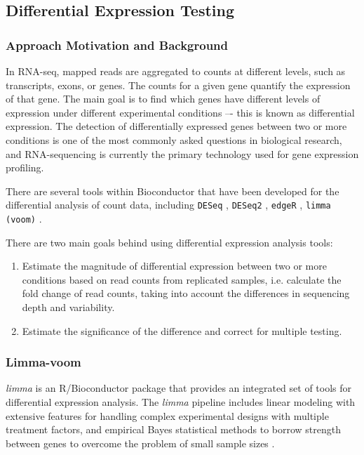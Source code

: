     \subsection{Differential Expression Testing}
    \subsubsection{Approach Motivation and Background}
    In RNA-seq, mapped reads are aggregated to counts at different levels, such as transcripts, exons, or genes. The counts for a given gene quantify the expression of that gene. The main goal is to find which genes have different levels of expression under different experimental conditions –- this is known as differential expression.
    The detection of differentially expressed genes between two or more conditions is one of the most commonly asked questions in biological research, and RNA-sequencing is currently the primary technology used for gene expression profiling.

    There are several tools within Bioconductor that have been developed for the differential analysis of count data, including \texttt{DESeq} \cite{anders2010differential}, \texttt{DESeq2} \cite{love2014moderated}, \texttt{edgeR} \cite{Robinson2010EdgeR:Data}, \texttt{limma (voom)} \cite{Ritchie2015LimmaStudies}.

    There are two main goals behind using differential expression analysis tools:
    \begin{enumerate}
    \item Estimate the magnitude of differential expression between two or more conditions based on read counts from replicated samples, i.e. calculate the fold change of read counts, taking into account the differences in sequencing depth and variability.
    \item Estimate the significance of the difference and correct for multiple testing.
    \end{enumerate}

        
        \subsubsection{Limma-voom} \label{section:voom}
        \textit{limma} is an R/Bioconductor package \cite{Ritchie2015LimmaStudies, smyth2004linear}  that provides an integrated set of tools for differential expression analysis. The \textit{limma} pipeline includes linear modeling with extensive features for handling complex experimental designs with multiple treatment factors, and empirical Bayes statistical methods to borrow strength between genes to overcome the problem of small sample sizes \cite{Ritchie2015LimmaStudies}.

